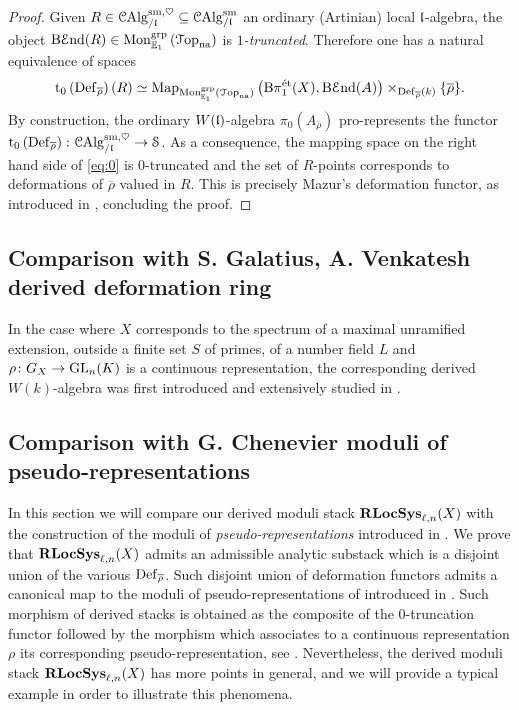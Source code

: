 \documentclass[10pt,a4paper]{amsart}
\numberwithin{equation}{subsection}
\theoremstyle{plain}
\theoremstyle{definition}
\theoremstyle{remark}
\numberwithin{equation}{section}
\begin{document}
\begin{proof}
Given $R \in \mathcal{C}\mathrm{Alg}_{/ \mathfrak l}^{\mathrm{sm}, \heartsuit} \subseteq \mathcal{C}\mathrm{Alg}_{/ \mathfrak l }^{\mathrm{sm}}$ an ordinary (Artinian) local $\mathfrak l$-algebra,
the object $\mathrm{B} \mathcal E \mathrm{nd}(R) \in \mathrm{Mon}_{\mathbb E_1}^{\mathrm{grp}} \left( \mathcal{T} \mathrm{op}_{\mathrm{na}}\right)$ is \emph{$1$-truncated}. Therefore one has a natural equivalence of spaces
	\begin{equation} \label{eq:0}
		\mathrm{t_0} \left( \mathbf{\mathrm{Def}}_{\overline{\rho}} \right) (R) \simeq \mathrm{Map}_{\mathrm{Mon}^{\mathrm{grp}}_{\mathbb E_1} \left( \mathcal{T} \mathrm{op}_{\mathrm{na}} \right) } \left( \mathrm B \pi_1^{\text{\'et}}(X), \mathrm{B} \mathcal E \mathrm{nd}(A) \right) \times_{\mathbf{\mathrm{Def}}_{\overline{\rho}}(k)} \{ \overline{\rho} \}.
	\end{equation}
By construction, the ordinary $W(\mathfrak l)$-algebra $\pi_0(A_{\overline{\rho}})$ pro-represents the functor $\mathrm t_0 \left( \mathbf{\mathrm{Def}}_{\overline{\rho}} \right) \colon \mathcal{C}\mathrm{Alg}_{/\mathfrak l}^{\mathrm{sm}, \heartsuit} \to \mathcal S
$. As a consequence, the
mapping space on the right hand side of \eqref{eq:0} is $0$-truncated and the set of $R$-points corresponds to deformations of $\overline{\rho}$ valued in $R$. This is precisely Mazur's deformation functor, as introduced in \cite[Section 1.2]{mazurDG}, concluding
the proof.
\end{proof}

\subsection{Comparison with S. Galatius, A. Venkatesh derived deformation ring} In the case where $X $ corresponds to the spectrum of a maximal unramified extension, outside a finite set $S $ of primes, of a number field $L$ and $\rho \colon G_X \to \mathrm{GL}_n(K)$
is a continuous representation, the corresponding derived $W(k)$-algebra was first introduced and extensively studied in \cite{galatius_dg}.

\subsection{Comparison with G. Chenevier moduli of pseudo-representations} In this section we will compare our derived moduli stack $\mathbf R \mathbf{LocSys}_{\ell, n}(X)$ with the construction of the moduli of \emph{pseudo-representations} introduced in \cite{chenevier}.
We prove that $\mathbf R \mathbf{LocSys}_{\ell, n}(X)$ admits an admissible analytic substack which is a disjoint union of the various $\mathbf{\mathrm{Def}}_{\overline{\rho}}$.
Such disjoint union of deformation functors admits a canonical map to the moduli of pseudo-representations of introduced in \cite{chenevier}. Such morphism of derived stacks is obtained as the composite of the $0$-truncation functor 
followed by the morphism which associates to a continuous representation $\rho $ its corresponding pseudo-representation, see \cite[Definition 1.5]{chenevier}. Nevertheless, the derived moduli stack $\mathbf R \mathbf{LocSys}_{\ell, n}(X)$
has more points in general, and we will provide a typical example in order to illustrate this phenomena.
\end{document}
